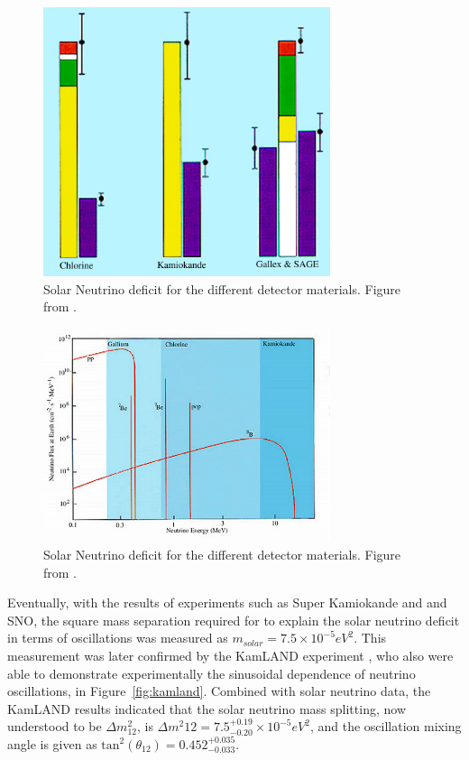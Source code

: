 \begin{figure}[htbp]
  \centering
  \includegraphics[width=0.75\textwidth]{intro_figures/solar_neutrino_deficit.png}
  \caption[Solar Neutrino Deficit]{Solar Neutrino deficit for the different detector materials.  Figure from \cite{solar_neutrino_image}.}
  \label{fig:solar_neutrino_deficit}
\end{figure}

\begin{figure}[htbp]
  \centering
  \includegraphics[width=0.75\textwidth]{intro_figures/solar_neutrino_flux.png}
  \caption[Solar Neutrino Deficit]{Solar Neutrino deficit for the different detector materials.  Figure from \cite{solar_neutrino_image}.}
  \label{fig:solar_neutrino_flux}
\end{figure}

Eventually, with the results of experiments such as Super Kamiokande and and SNO, the square mass separation required for to explain the solar neutrino deficit in terms of oscillations was measured as $m_{solar} = 7.5 \times 10^{-5} eV^2$.  This measurement was later confirmed by the KamLAND experiment \cite{Eguchi:2002dm, Araki:2004mb}, who also were able to demonstrate experimentally the sinusoidal dependence of neutrino oscillations, in Figure~\ref{fig:kamland}.  Combined with solar neutrino data, the KamLAND results \cite{Abe:2008aa,Gando:2010aa} indicated that the solar neutrino mass splitting, now understood to be $\Delta m^2_{12}$, is $\Delta m^2{12} = 7.5^{+0.19}_{-0.20} \times 10^{-5} eV^2$, and the oscillation mixing angle is given as $\text{tan}^2(\theta_{12}) = 0.452^{+0.035}_{-0.033}$.

